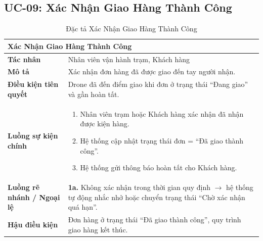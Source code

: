 \subsection{UC-09: Xác Nhận Giao Hàng Thành Công}
\begin{table}[H]
  \centering
  \begin{tabularx}{\textwidth}{|l|X|}
    \hline
    \multicolumn{2}{|l|}{\textbf{Xác Nhận Giao Hàng Thành Công}} \\
    \hline
    \textbf{Tác nhân}           & Nhân viên vận hành trạm, Khách hàng \\ \hline
    \textbf{Mô tả}              & Xác nhận đơn hàng đã được giao đến tay người nhận. \\ \hline
    \textbf{Điều kiện tiên quyết} & Drone đã đến điểm giao khi đơn ở trạng thái ``Đang giao'' và gần hoàn tất. \\ \hline
    \textbf{Luồng sự kiện chính} &
      \begin{enumerate}[leftmargin=*, nosep, topsep=0pt]
        \item Nhân viên trạm hoặc Khách hàng xác nhận đã nhận được kiện hàng.
        \item Hệ thống cập nhật trạng thái đơn = ``Đã giao thành công''.
        \item Hệ thống gửi thông báo hoàn tất cho Khách hàng.
      \end{enumerate} \\ \hline
    \textbf{Luồng rẽ nhánh / Ngoại lệ} &
      \textbf{1a.} Không xác nhận trong thời gian quy định $\rightarrow$ hệ thống tự động nhắc nhở hoặc chuyển trạng thái ``Chờ xác nhận quá hạn''. \\ \hline
    \textbf{Hậu điều kiện}      & Đơn hàng ở trạng thái ``Đã giao thành công'', quy trình giao hàng kết thúc. \\
    \hline
  \end{tabularx}
  \caption{Đặc tả Xác Nhận Giao Hàng Thành Công}
  \label{tab:uc09}
\end{table}

